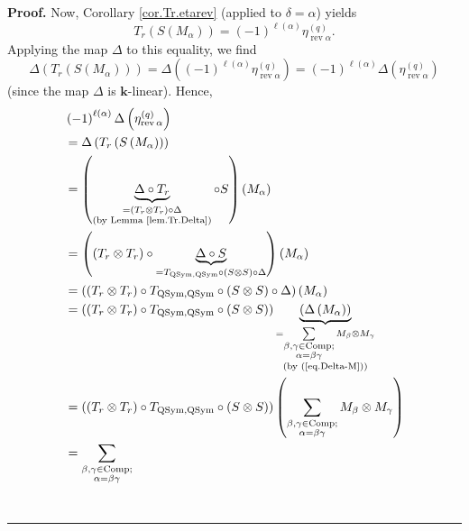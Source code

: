 \documentclass[numbers=enddot,12pt,final,onecolumn,notitlepage]{scrartcl}%
\theoremstyle{definition}
\newenvironment{proof}[1][Proof]{\noindent\textbf{#1.} }{\ \rule{0.5em}{0.5em}}
\let\sumnonlimits\sum
\renewcommand{\sum}{\sumnonlimits\limits}
\newenvironment{verlong}{}{}
\begin{document}
\begin{verlong}
\begin{proof}
Now, Corollary \ref{cor.Tr.etarev} (applied to $\delta=\alpha$) yields%
\[
T_{r}\left(  S\left(  M_{\alpha}\right)  \right)  =\left(  -1\right)
^{\ell\left(  \alpha\right)  }\eta_{\operatorname*{rev}\alpha}^{\left(
q\right)  }.
\]
Applying the map $\Delta$ to this equality, we find%
\[
\Delta\left(  T_{r}\left(  S\left(  M_{\alpha}\right)  \right)  \right)
=\Delta\left(  \left(  -1\right)  ^{\ell\left(  \alpha\right)  }%
\eta_{\operatorname*{rev}\alpha}^{\left(  q\right)  }\right)  =\left(
-1\right)  ^{\ell\left(  \alpha\right)  }\Delta\left(  \eta
_{\operatorname*{rev}\alpha}^{\left(  q\right)  }\right)
\]
(since the map $\Delta$ is $\mathbf{k}$-linear). Hence,
\begin{align*}
&  \left(  -1\right)  ^{\ell\left(  \alpha\right)  }\Delta\left(
\eta_{\operatorname*{rev}\alpha}^{\left(  q\right)  }\right) \\
&  =\Delta\left(  T_{r}\left(  S\left(  M_{\alpha}\right)  \right)  \right) \\
&  =\left(  \underbrace{\Delta\circ T_{r}}_{\substack{=\left(  T_{r}\otimes
T_{r}\right)  \circ\Delta\\\text{(by Lemma \ref{lem.Tr.Delta})}}}\circ
S\right)  \left(  M_{\alpha}\right) \\
&  =\left(  \left(  T_{r}\otimes T_{r}\right)  \circ\underbrace{\Delta\circ
S}_{=T_{\operatorname*{QSym},\operatorname*{QSym}}\circ\left(  S\otimes
S\right)  \circ\Delta}\right)  \left(  M_{\alpha}\right) \\
&  =\left(  \left(  T_{r}\otimes T_{r}\right)  \circ T_{\operatorname*{QSym}%
,\operatorname*{QSym}}\circ\left(  S\otimes S\right)  \circ\Delta\right)
\left(  M_{\alpha}\right) \\
&  =\left(  \left(  T_{r}\otimes T_{r}\right)  \circ T_{\operatorname*{QSym}%
,\operatorname*{QSym}}\circ\left(  S\otimes S\right)  \right)
\underbrace{\left(  \Delta\left(  M_{\alpha}\right)  \right)  }%
_{\substack{=\sum_{\substack{\beta,\gamma\in\operatorname*{Comp}%
;\\\alpha=\beta\gamma}}M_{\beta}\otimes M_{\gamma}\\\text{(by
(\ref{eq.Delta-M}))}}}\\
&  =\left(  \left(  T_{r}\otimes T_{r}\right)  \circ T_{\operatorname*{QSym}%
,\operatorname*{QSym}}\circ\left(  S\otimes S\right)  \right)  \left(
\sum_{\substack{\beta,\gamma\in\operatorname*{Comp};\\\alpha=\beta\gamma
}}M_{\beta}\otimes M_{\gamma}\right) \\
&  =\sum_{\substack{\beta,\gamma\in\operatorname*{Comp};\\\alpha=\beta\gamma
}}
\end{align*}
\end{proof}
\end{verlong}
\end{document}
